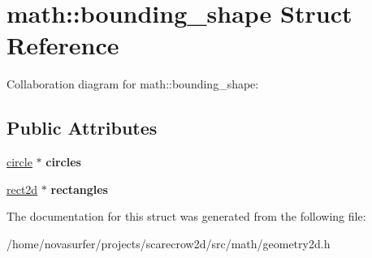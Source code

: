 \hypertarget{structmath_1_1bounding__shape}{}\section{math\+:\+:bounding\+\_\+shape Struct Reference}
\label{structmath_1_1bounding__shape}


Collaboration diagram for math\+:\+:bounding\+\_\+shape\+:
\subsection*{Public Attributes}
\begin{DoxyCompactItemize}
\item 
\mbox{\label{structmath_1_1bounding__shape_abf9b97dc44da779d089b3d1122c6f5bc}} 
\hyperlink{structmath_1_1circle}{circle} $\ast$ {\bfseries circles}
\item 
\mbox{\label{structmath_1_1bounding__shape_a834b1f8af09e71a6d50f1a8e38fbb39a}} 
\hyperlink{structmath_1_1rect2d}{rect2d} $\ast$ {\bfseries rectangles}
\end{DoxyCompactItemize}


The documentation for this struct was generated from the following file\+:\begin{DoxyCompactItemize}
\item 
/home/novasurfer/projects/scarecrow2d/src/math/geometry2d.\+h\end{DoxyCompactItemize}
